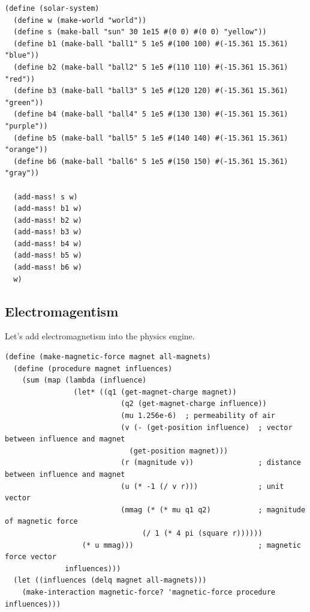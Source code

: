 \documentclass{article}
\begin{document}
{\small\begin{verbatim}
(define (solar-system)
  (define w (make-world "world"))
  (define s (make-ball "sun" 30 1e15 #(0 0) #(0 0) "yellow"))
  (define b1 (make-ball "ball1" 5 1e5 #(100 100) #(-15.361 15.361) "blue"))
  (define b2 (make-ball "ball2" 5 1e5 #(110 110) #(-15.361 15.361) "red"))
  (define b3 (make-ball "ball3" 5 1e5 #(120 120) #(-15.361 15.361) "green"))
  (define b4 (make-ball "ball4" 5 1e5 #(130 130) #(-15.361 15.361) "purple"))
  (define b5 (make-ball "ball5" 5 1e5 #(140 140) #(-15.361 15.361) "orange"))
  (define b6 (make-ball "ball6" 5 1e5 #(150 150) #(-15.361 15.361) "gray"))

  (add-mass! s w)
  (add-mass! b1 w)
  (add-mass! b2 w)
  (add-mass! b3 w)
  (add-mass! b4 w)
  (add-mass! b5 w)
  (add-mass! b6 w)
  w)
\end{verbatim}}

\subsection{Electromagentism}

Let's add electromagnetism into the physics engine. 

{\small\begin{verbatim}
(define (make-magnetic-force magnet all-magnets)
  (define (procedure magnet influences)
    (sum (map (lambda (influence)
                (let* ((q1 (get-magnet-charge magnet))
                           (q2 (get-magnet-charge influence))
                           (mu 1.256e-6)  ; permeability of air
                           (v (- (get-position influence)  ; vector between influence and magnet
                             (get-position magnet)))
                           (r (magnitude v))               ; distance between influence and magnet
                           (u (* -1 (/ v r)))              ; unit vector
                           (mmag (* (* mu q1 q2)           ; magnitude of magnetic force
                                (/ 1 (* 4 pi (square r))))))
                  (* u mmag)))                             ; magnetic force vector
              influences)))
  (let ((influences (delq magnet all-magnets)))
    (make-interaction magnetic-force? 'magnetic-force procedure influences)))
\end{verbatim}}

\end{document}
